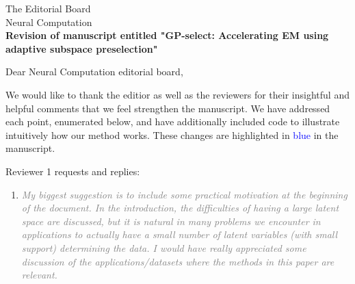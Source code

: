 \documentclass[10pt]{letter}
\newcommand{\rvr}[1]{\textcolor{gray}{#1}}
\begin{document}
\begin{letter}{
The Editorial Board\\
Neural Computation\\
\vspace{10mm}
\textbf{Revision of manuscript entitled "GP-select: Accelerating EM using adaptive
subspace preselection"}
}

%
%
%
%
%
%
% 

\opening{Dear Neural Computation editorial board,}

We would like to thank the editior as well as the reviewers for their insightful and helpful comments that we feel strengthen the manuscript.  We have addressed each point, enumerated below, and have additionally included code to illustrate intuitively how our method works. These changes are highlighted in \textcolor{blue}{blue} in the manuscript.


Reviewer 1 requests and replies:

\begin{enumerate}[topsep=3pt,itemsep=2ex,partopsep=1ex,parsep=1ex]
    \item \rvr{\emph{My biggest suggestion is to include some practical motivation at the beginning of the document. In the introduction, the difficulties of having a large latent space are discussed, but it is natural in many problems we encounter in applications to actually have a small number of latent variables (with small support) determining the data. I would have really appreciated some discussion of the applications/datasets where the methods in this paper are relevant.}}


\end{enumerate}
\end{letter}
\end{document}
